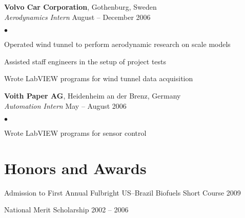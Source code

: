 \documentclass[margin,line]{res}
\newenvironment{list2}{
  \begin{list}{$\bullet$}{%
      \setlength{\itemsep}{0in}
      \setlength{\parsep}{0in} \setlength{\parskip}{0in}
      \setlength{\topsep}{0in} \setlength{\partopsep}{0in} 
      \setlength{\leftmargin}{0.2in}}}{\end{list}}
\begin{document}
\begin{resume}
\vspace*{-.1in}

{\bf Volvo Car Corporation}, Gothenburg, Sweden\\
\vspace{-.3cm}
{\em Aerodynamics Intern} \hfill August -- December 2006\\
\begin{list2}
\item Operated wind tunnel to perform aerodynamic research on scale models
\item Assisted staff engineers in the setup of project tests
\item Wrote LabVIEW programs for wind tunnel data acquisition
\end{list2}

\vspace*{-.1in}

{\bf Voith Paper AG}, Heidenheim an der Brenz, Germany\\
\vspace{-.3cm}
{\em Automation Intern} \hfill May -- August 2006\\
\begin{list2}
\item Wrote LabVIEW programs for sensor control
\end{list2}

\section{\sc Honors and Awards} 
Admission to First Annual Fulbright US--Brazil Biofuels Short Course \hfill 2009\\
\vspace*{-.3in}

National Merit Scholarship			\hfill 2002 -- 2006\\


\end{resume}
\end{document}
